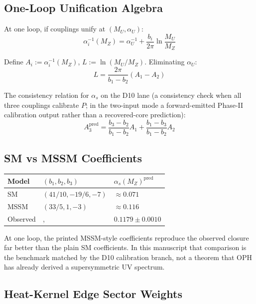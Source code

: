 \subsection{One-Loop Unification Algebra}\label{51-one-loop-unification-algebra}

At one loop, if couplings unify at \((M_U, \alpha_U)\): \[\alpha_i^{-1}(M_Z) = \alpha_U^{-1} + \frac{b_i}{2\pi}\ln\frac{M_U}{M_Z}\]

Define \(A_i := \alpha_i^{-1}(M_Z)\), \(L := \ln(M_U/M_Z)\). Eliminating \(\alpha_U\): \[L = \frac{2\pi}{b_1 - b_2}(A_1 - A_2)\]

The consistency relation for \(\alpha_s\) on the D10 lane (a consistency check when all three couplings calibrate $P$; in the two-input mode a forward-emitted Phase-II calibration output rather than a recovered-core prediction): \[A_3^{\text{pred}} = \frac{b_3 - b_2}{b_1 - b_2}A_1 + \frac{b_1 - b_3}{b_1 - b_2}A_2\]

\subsection{SM vs MSSM Coefficients}\label{52-sm-vs-mssm-coefficients}

{\def\LTcaptype{none} %
\begin{longtable}[]{@{}>{\RaggedRight\arraybackslash}p{}>{\RaggedRight\arraybackslash}p{}>{\RaggedRight\arraybackslash}p{}@{}}
\toprule\noalign{}
Model & \((b_1, b_2, b_3)\) & \(\alpha_s(M_Z)^{\text{pred}}\) \\
\midrule\noalign{}
\endhead
\bottomrule\noalign{}
\endlastfoot
SM & \((41/10, -19/6, -7)\) & \(\approx 0.071\) \\
MSSM & \((33/5, 1, -3)\) & \(\approx 0.116\) \\
Observed &, & \(0.1179 \pm 0.0010\) \\
\end{longtable}
}

At one loop, the printed MSSM-style coefficients reproduce the observed closure far better than the plain SM coefficients. In this manuscript that comparison is the benchmark matched by the D10 calibration branch, not a theorem that OPH has already derived a supersymmetric UV spectrum.

\subsection{Heat-Kernel Edge Sector Weights}\label{53-heat-kernel-edge-sector-weights}

